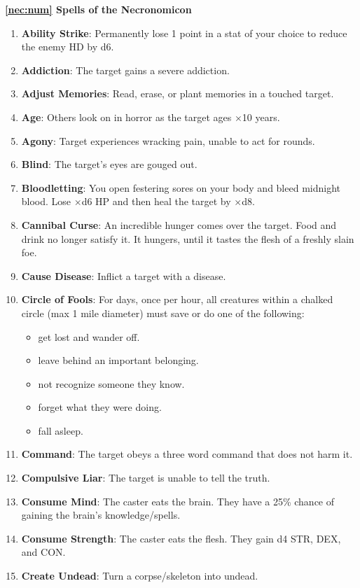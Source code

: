 \documentclass[twoside]{article}
\newcommand{\lle}{\raisebox{\depth}{\rotatebox{180}{$\ell$}}}
\begin{document}
\textbf{\ref*{nec:num} Spells of the Necronomicon}
\begin{enumerate}[nosep]
\item \textbf{Ability Strike}: Permanently lose 1 point in a stat of your choice to reduce the enemy HD by d6.
\item \textbf{Addiction}: The target gains a severe addiction.
\item \textbf{Adjust Memories}: Read, erase, or plant memories in a touched target.
\item \textbf{Age}: Others look on in horror as the target ages \lle$\times$10 years.
\item \textbf{Agony}: Target experiences wracking pain, unable to act for \lle{} rounds.
\item \textbf{Blind}: The target's eyes are gouged out.
\item \textbf{Bloodletting}: You open festering sores on your body and bleed midnight blood. Lose \lle$\times$d6 HP and then heal the target by \lle$\times$d8.
\item \textbf{Cannibal Curse}: An incredible hunger comes over the target. Food and drink no longer satisfy it. It hungers, until it tastes the flesh of a freshly slain foe.
\item \textbf{Cause Disease}: Inflict a target with a disease.
\item \textbf{Circle of Fools}: For \lle{} days, once per hour, all creatures within a chalked circle (max 1 mile diameter) must save or do one of the following:
\begin{itemize}[nosep]
\item get lost and wander off.
\item leave behind an important belonging.
\item not recognize someone they know.
\item forget what they were doing.
\item fall asleep.
\end{itemize}
\item \textbf{Command}: The target obeys a three word command that does not harm it.
\item \textbf{Compulsive Liar}: The target is unable to tell the truth.
\item \textbf{Consume Mind}: The caster eats the brain. They have a 25\% chance of gaining the brain's knowledge/spells.
\item \textbf{Consume Strength}: The caster eats the flesh. They gain d4 STR, DEX, and CON.
\item \textbf{Create Undead}: Turn a corpse/skeleton into undead.

\end{enumerate}
\end{document}
